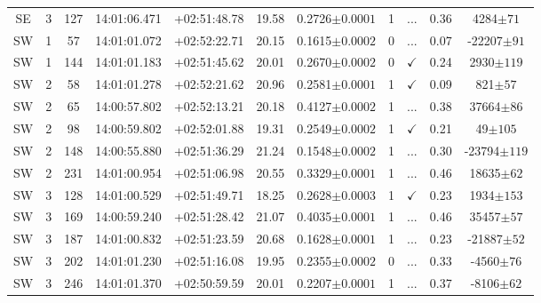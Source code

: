 \begin{table*}
\begin{tabular}{ccccccccccc}
SE & 3 & 127 & 14:01:06.471 & +02:51:48.78 & 19.58 & 0.2726$\pm{0.0001}$ & 1 & ... & 0.36 & 4284$\pm{71}$ \\
SW & 1 & 57 & 14:01:01.072 & +02:52:22.71 & 20.15 & 0.1615$\pm{0.0002}$ & 0 & ... & 0.07 & -22207$\pm{91}$ \\
SW & 1 & 144 & 14:01:01.183 & +02:51:45.62 & 20.01 & 0.2670$\pm{0.0002}$ & 0 & $\checkmark$ & 0.24 & 2930$\pm{119}$ \\
SW & 2 & 58 & 14:01:01.278 & +02:52:21.62 & 20.96 & 0.2581$\pm{0.0001}$ & 1 & $\checkmark$ & 0.09 & 821$\pm{57}$ \\
SW & 2 & 65 & 14:00:57.802 & +02:52:13.21 & 20.18 & 0.4127$\pm{0.0002}$ & 1 & ... & 0.38 & 37664$\pm{86}$ \\
SW & 2 & 98 & 14:00:59.802 & +02:52:01.88 & 19.31 & 0.2549$\pm{0.0002}$ & 1 & $\checkmark$ & 0.21 & 49$\pm{105}$ \\
SW & 2 & 148 & 14:00:55.880 & +02:51:36.29 & 21.24 & 0.1548$\pm{0.0002}$ & 1 & ... & 0.30 & -23794$\pm{119}$ \\
SW & 2 & 231 & 14:01:00.954 & +02:51:06.98 & 20.55 & 0.3329$\pm{0.0001}$ & 1 & ... & 0.46 & 18635$\pm{62}$ \\
SW & 3 & 128 & 14:01:00.529 & +02:51:49.71 & 18.25 & 0.2628$\pm{0.0003}$ & 1 & $\checkmark$ & 0.23 & 1934$\pm{153}$ \\
SW & 3 & 169 & 14:00:59.240 & +02:51:28.42 & 21.07 & 0.4035$\pm{0.0001}$ & 1 & ... & 0.46 & 35457$\pm{57}$ \\
SW & 3 & 187 & 14:01:00.832 & +02:51:23.59 & 20.68 & 0.1628$\pm{0.0001}$ & 1 & ... & 0.23 & -21887$\pm{52}$ \\
SW & 3 & 202 & 14:01:01.230 & +02:51:16.08 & 19.95 & 0.2355$\pm{0.0002}$ & 0 & ... & 0.33 & -4560$\pm{76}$ \\
SW & 3 & 246 & 14:01:01.370 & +02:50:59.59 & 20.01 & 0.2207$\pm{0.0001}$ & 1 & ... & 0.37 & -8106$\pm{62}$ \\
		\hline
	\end{tabular}
	\label{tbl:c210p27+2p87}
\end{table*}

